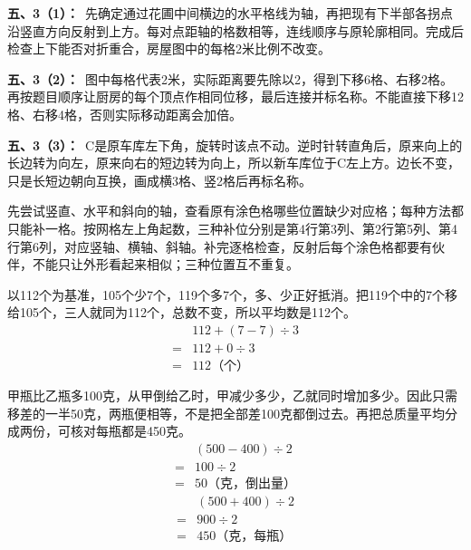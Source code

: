 \documentclass[multi=snippet,border=0pt]{standalone}
\newenvironment{snippet}[3]{\begin{minipage}{#1bp}\color{answerred}\fontsize{#2}{#3}\selectfont\raggedright}{\end{minipage}}
\begin{document}
\begin{snippet}{505}{11.5}{14}\textbf{五、3（1）：}\ 先确定通过花圃中间横边的水平格线为轴，再把现有下半部各拐点沿竖直方向反射到上方。每对点距轴的格数相等，连线顺序与原轮廓相同。完成后检查上下能否对折重合，房屋图中的每格2米比例不改变。\end{snippet}
\begin{snippet}{505}{11.5}{14}\textbf{五、3（2）：}\ 图中每格代表2米，实际距离要先除以2，得到下移6格、右移2格。再按题目顺序让厨房的每个顶点作相同位移，最后连接并标名称。不能直接下移12格、右移4格，否则实际移动距离会加倍。\end{snippet}
\begin{snippet}{505}{11.5}{14}\textbf{五、3（3）：}\ C是原车库左下角，旋转时该点不动。逆时针转直角后，原来向上的长边转为向左，原来向右的短边转为向上，所以新车库位于C左上方。边长不变，只是长短边朝向互换，画成横3格、竖2格后再标名称。\end{snippet}
\begin{snippet}{505}{11.5}{14}先尝试竖直、水平和斜向的轴，查看原有涂色格哪些位置缺少对应格；每种方法都只能补一格。按网格左上角起数，三种补位分别是第4行第3列、第2行第5列、第4行第6列，对应竖轴、横轴、斜轴。补完逐格检查，反射后每个涂色格都要有伙伴，不能只让外形看起来相似；三种位置互不重复。\end{snippet}
\begin{snippet}{505}{11.5}{14}以112个为基准，105个少7个，119个多7个，多、少正好抵消。把119个中的7个移给105个，三人就同为112个，总数不变，所以平均数是112个。\[\begin{aligned}&112+(7-7)\div3\\={}&112+0\div3\\={}&112\text{（个）}\end{aligned}\]\end{snippet}
\begin{snippet}{505}{11.5}{14}甲瓶比乙瓶多100克，从甲倒给乙时，甲减少多少，乙就同时增加多少。因此只需移差的一半50克，两瓶便相等，不是把全部差100克都倒过去。再把总质量平均分成两份，可核对每瓶都是450克。\[\begin{aligned}&(500-400)\div2\\={}&100\div2\\={}&50\text{（克，倒出量）}\end{aligned}\]\[\begin{aligned}&(500+400)\div2\\={}&900\div2\\={}&450\text{（克，每瓶）}\end{aligned}\]\end{snippet}
\end{document}
